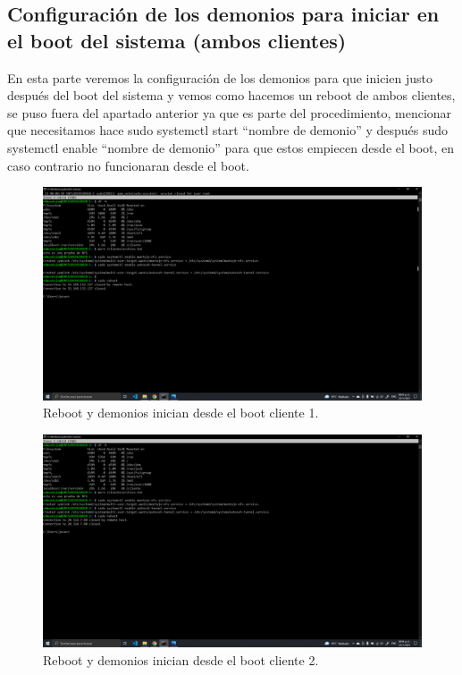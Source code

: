 \documentclass[11pt]{article}
\begin{document}
		\subsection{Configuración de los demonios para iniciar en el boot del sistema (ambos clientes)}
		En esta parte veremos la configuración de los demonios para que inicien justo después del boot del sistema y vemos como hacemos un reboot de ambos clientes, se puso fuera del apartado anterior ya que es parte del procedimiento, mencionar que necesitamos hace sudo systemctl start ``nombre de demonio'' y después sudo systemctl enable ``nombre de demonio'' para que estos empiecen desde el boot, en caso contrario no funcionaran desde el boot.
		\begin{figure}[H]
			\centering
			\includegraphics[scale=0.34]{resources/p8y9c1.png}
			\caption{Reboot y demonios inician desde el boot cliente 1.}\label{fig:picture}
		\end{figure}
		\begin{figure}[H]
			\centering
			\includegraphics[scale=0.34]{resources/p8y9c2.png}
			\caption{Reboot y demonios inician desde el boot cliente 2.}\label{fig:picture}
		\end{figure}	
			
\end{document}
